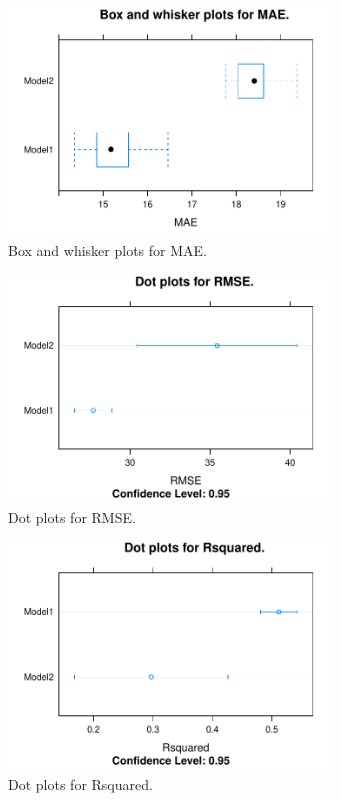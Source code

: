 \begin{figure} 
\centering  
\includegraphics[width=0.77\textwidth]{Code_Outputs/ML_compare_models_bwplot_MAE.pdf} 
\caption{\label{fig:ML_compare_modelsbwplot_MAE}Box and whisker plots for MAE.} 
\end{figure} 
 

\begin{figure} 
\centering  
\includegraphics[width=0.77\textwidth]{Code_Outputs/ML_compare_models_dotplot_RMSE.pdf} 
\caption{\label{fig:ML_compare_modelsdotplot_RMSE}Dot plots for RMSE.} 
\end{figure} 
 

\begin{figure} 
\centering  
\includegraphics[width=0.77\textwidth]{Code_Outputs/ML_compare_models_dotplot_Rsquared.pdf} 
\caption{\label{fig:ML_compare_modelsdotplot_Rsquared}Dot plots for Rsquared.} 
\end{figure} 
 

